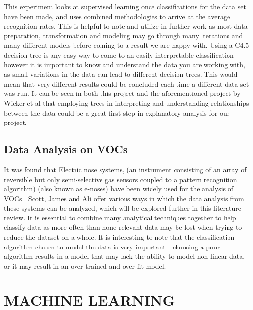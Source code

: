 \documentclass[letterpaper, 10 pt, conference]{ieeeconf}  %
\begin{document}
This experiment looks at supervised learning once classifications for the data set have been made, and uses combined methodologies to arrive at the average recognition rates.  This is helpful to note and utilize in further work as most data preparation, transformation and modeling may go through many iterations and many different models before coming to a result we are happy with. Using a C4.5 decision tree is any easy way to come to an easily interpretable classification however it is important to know and understand the data you are working with, as small variations in the data can lead to different decision trees.  This would mean that very different results could be concluded each time a different data set was run. It can be seen in both this project and the aforementioned project by Wicker et al \cite{NATURE} \cite{Wicker:2015:CDM:2783258.2783404} that employing trees in interpreting and understanding relationships between the data could be a great first step in explanatory analysis for our project.
 
\subsection{Data Analysis on VOCs}
It was found that Electric nose systems, (an instrument consisting of an array of reversible but only semi-selective gas sensors coupled to a pattern recognition algorithm) (also known as e-noses) have been widely used for the analysis of VOCs \cite{Scott2006}.  Scott, James and Ali offer various ways in which the data analysis from these systems can be analyzed, which will be explored further in this literature review. It is essential to combine many analytical techniques together to help classify data as more often than none relevant data may be lost when trying to reduce the dataset on a whole. It is interesting to note that the classification algorithm chosen to model the data is very important - choosing a poor algorithm results in a model that may lack the ability to model non linear data, or it may result in an over trained and over-fit model.  


\section{MACHINE LEARNING}
\end{document}
